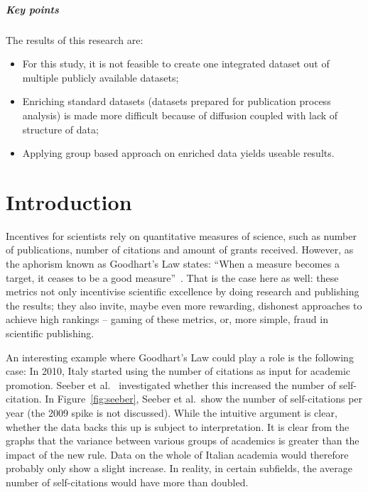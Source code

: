 \documentclass{ou-report}
\begin{document}
\paragraph{Key points}
The results of this research are:
\begin{itemize}
    \item For this study, it is not feasible to create one integrated dataset
        out of multiple publicly available datasets;
    \item Enriching standard datasets (datasets prepared for publication process
        analysis) is made more difficult because of diffusion coupled with lack
        of structure of data;
    \item Applying group based approach on enriched data yields useable results.
\end{itemize}


\chapter{Introduction}
Incentives for scientists rely on quantitative measures of science, such as 
number of publications, number of citations and amount of grants received. 
However, as the aphorism known as Goodhart's Law states: ``When a measure 
becomes a target, it ceases to be a good measure''~\cite{strathern_1997}. That 
is the case here as well: these metrics not only incentivise scientific 
excellence by doing research and publishing the results; they also invite, 
maybe even more rewarding, dishonest approaches to achieve high rankings 
-- gaming of these metrics, or, more simple, fraud in scientific publishing. 

An interesting example where Goodhart's Law could play a role is the following
case: In 2010, Italy started using the number of citations as input for academic
promotion. Seeber et al.~\cite{SEEBER2019478} investigated whether this
increased the number of  self-citation. In Figure~\ref{fig:seeber}, Seeber et
al.~show the number of self-citations per year (the 2009 spike is not
discussed).
While the intuitive argument is clear, whether the data backs this up is subject
to interpretation. It is clear from the graphs that the variance between various
groups of academics is greater than the impact of the new rule. Data on the
whole of Italian academia would therefore probably only show a slight increase.
In reality, in certain subfields, the average number of self-citations would
have more than doubled.
\end{document}
